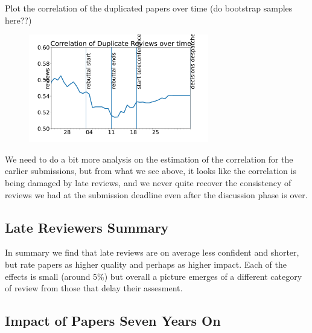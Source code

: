 Plot the correlation of the duplicated papers over time (do bootstrap
samples here??)

\begin{figure}[htb]
\includegraphics[width=0.70\textwidth]{diagrams/neurips/correlation-duplicate-reviews.pdf}


\caption{}
\label{correlation-duplicate-reviews}
\end{figure}

We need to do a bit more analysis on the estimation of the correlation
for the earlier submissions, but from what we see above, it looks like
the correlation is being damaged by late reviews, and we never quite
recover the consistency of reviews we had at the submission deadline
even after the discussion phase is over.

\hypertarget{late-reviewers-summary}{%
\subsection{Late Reviewers Summary}\label{late-reviewers-summary}}

In summary we find that late reviews are on average less confident and
shorter, but rate papers as higher quality and perhaps as higher impact.
Each of the effects is small (around 5\%) but overall a picture emerges
of a different category of review from those that delay their assesment.

\hypertarget{impact-of-papers-seven-years-on}{%
\subsection{Impact of Papers Seven Years
On}\label{impact-of-papers-seven-years-on}}

\begin{flushright}
\end{flushright}


